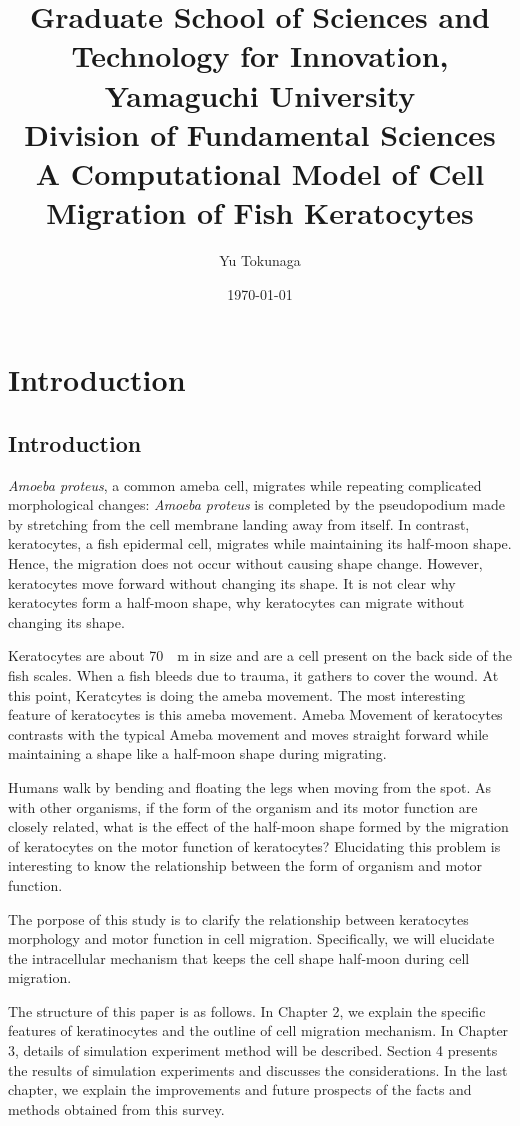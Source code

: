 \documentclass[a4paper,12pt]{book}
\title{\Large Graduate School of Sciences and Technology for Innovation, Yamaguchi University\\[1cm]
Division of Fundamental Sciences\\[3cm]
\huge A Computational Model of Cell Migration of Fish Keratocytes\\[5cm]
}
\author{Yu Tokunaga}
\date{\Large \today}
\begin{document}
\maketitle
\setcounter{page}{1}
\tableofcontents
\chapter{Introduction}
\setcounter{page}{1}
\section{Introduction}
{\it Amoeba proteus}, a common ameba cell, migrates while repeating complicated morphological changes:
{\it Amoeba proteus} is completed by the pseudopodium made by stretching from the cell membrane landing away from itself.
In contrast, keratocytes, a fish epidermal cell, migrates while maintaining its half-moon shape.
Hence, the migration does not occur without causing shape change.
However, keratocytes move forward without changing its shape. It is not clear why keratocytes form a half-moon shape, why keratocytes can migrate without changing its shape.

Keratocytes are about \SI{70}{\mu m} in size and are a cell present on the back side of the fish scales. When a fish bleeds due to trauma, it gathers to cover the wound. At this point, Keratcytes is doing the ameba movement. The most interesting feature of keratocytes is this ameba movement. Ameba Movement of keratocytes  contrasts with the typical Ameba movement and moves straight forward while maintaining a shape like a half-moon shape during migrating.

Humans walk by bending and floating the legs when moving from the spot. As with other organisms, if the form of the organism and its motor function are closely related, what is the effect of the half-moon shape formed by the migration of keratocytes on the motor function of keratocytes? Elucidating this problem is interesting to know the relationship between the form of organism and motor function.

The porpose of this study is to clarify the relationship between keratocytes morphology and motor function in cell migration. Specifically, we will elucidate the intracellular mechanism that keeps the cell shape half-moon during cell migration.

The structure of this paper is as follows. In Chapter 2, we explain the specific features of keratinocytes and the outline of cell migration mechanism. In Chapter 3, details of simulation experiment method will be described. Section 4 presents the results of simulation experiments and discusses the considerations. In the last chapter, we explain the improvements and future prospects of the facts and methods obtained from this survey.
\end{document}
